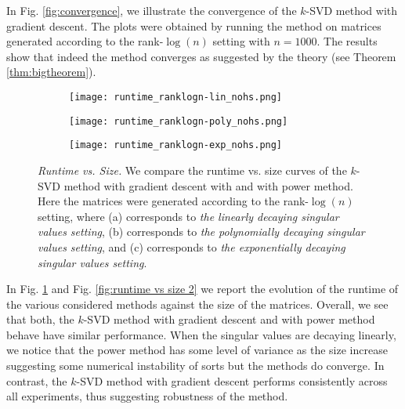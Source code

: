 In Fig. \ref{fig:convergence}, we illustrate the convergence of the $k$-SVD method with gradient descent. The plots were obtained by running the method on matrices generated according to the rank-$\log(n)$ setting with $n=1000$. The results show that indeed the method converges as suggested by the theory (see Theorem \ref{thm:bigtheorem}).

\begin{figure}[ht!]
    \centering 
    \begin{subfigure}[b]{.32\textwidth}
        \texttt{[image: runtime\_ranklogn-lin\_nohs.png]} 
    \end{subfigure}
    \begin{subfigure}[b]{.32\textwidth}
        \texttt{[image: runtime\_ranklogn-poly\_nohs.png]} 
    \end{subfigure}
    \begin{subfigure}[b]{.32\textwidth}
        \texttt{[image: runtime\_ranklogn-exp\_nohs.png]}
    \end{subfigure}
    \caption{\emph{Runtime vs. Size.} We compare the runtime vs. size curves of the $k$-SVD method with gradient descent with  and  with power method. Here the matrices were generated according to the rank-$\log(n)$ setting, where (a) corresponds to \emph{the linearly decaying singular values setting}, (b) corresponds to \emph{the polynomially decaying singular values setting}, and (c) corresponds to \emph{the exponentially decaying singular values setting}.}
    \label{fig:runtime vs size 1}
\end{figure}

In Fig. \ref{fig:runtime vs size 1} and Fig. \ref{fig:runtime vs size 2} we report the evolution of the runtime of the various considered methods against the size of the matrices. Overall, we see that both, the $k$-SVD method with  gradient descent and with power method behave have similar performance. When the singular values are decaying linearly, we notice that the power method has some level of variance as the size increase suggesting some numerical instability of sorts but the methods do converge. In contrast, the $k$-SVD method with gradient descent performs consistently across all experiments, thus suggesting robustness of the method.    


